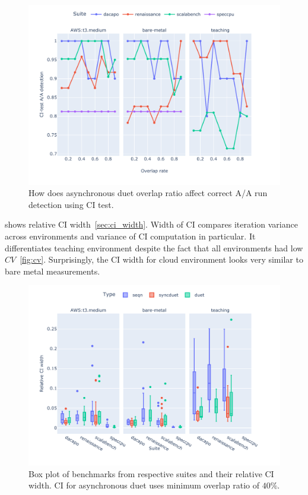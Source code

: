\begin{figure}
	\centering
	\includegraphics[width=1\linewidth]{./figures/citest_aa_match_by_overlap.pdf}
	\caption{
		How does asynchronous duet overlap ratio affect correct A/A run detection using CI test.
	}
	\label{fig:citest_overlap_aa}
\end{figure}

 shows relative CI width~\ref{sec:ci_width}.
Width of CI compares iteration variance across environments and variance of CI computation in particular.
It differentiates teaching environment despite the fact that all environments had low $CV$~\ref{fig:cv}.
Surprisingly, the CI width for cloud environment looks very similar to bare metal measurements.

\begin{figure}
	\centering
	\includegraphics[width=1\linewidth]{./figures/ci_width.pdf}
	\caption{
		Box plot of benchmarks from respective suites and their relative CI width. 
		CI for asynchronous duet uses minimum overlap ratio of $40\%$.
	}
	\label{fig:suite_cv}
\end{figure}

